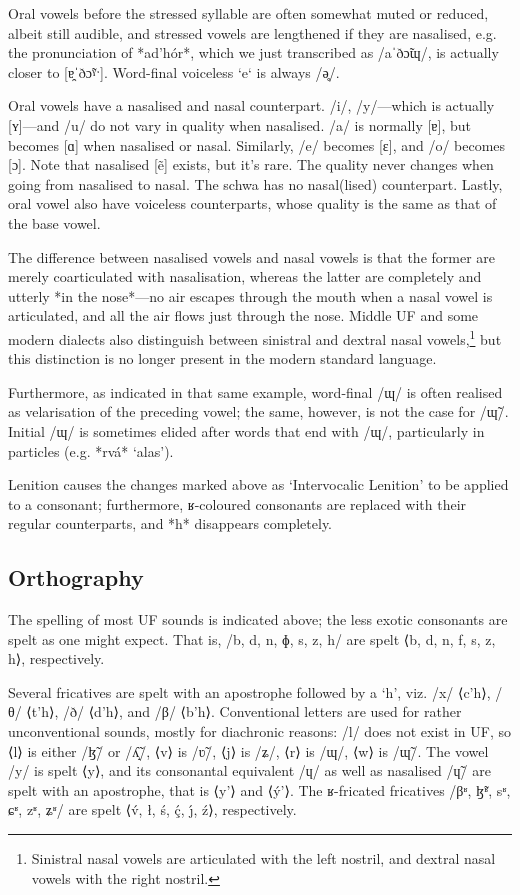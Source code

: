 \documentclass[a4paper, 12pt, oneside, final]{article}
\begin{document}
Oral vowels before the stressed syllable are often somewhat muted or reduced, albeit still audible, and stressed vowels are lengthened if they
are nasalised, e.g. the pronunciation of *ad’hór*, which we just transcribed as /aˈðɔ̃ɰ/, is actually closer to [ɐ̯ˈðɔ̃ˠˑ].
Word-final voiceless `e` is always /ə̥/.

Oral vowels have a nasalised and nasal counterpart. /i/, /y/—which is actually [ʏ]—and /u/ do not vary in quality when nasalised.
/a/ is normally [ɐ],
but becomes [ɑ] when nasalised or nasal. Similarly, /e/ becomes [ɛ], and /o/ becomes [ɔ]. Note that nasalised [ẽ] exists, but it’s
rare. The quality never changes when going from nasalised to nasal. The schwa has no nasal(lised) counterpart. Lastly, oral vowel
also have voiceless counterparts, whose quality is the same as that of the base vowel.

The difference between nasalised vowels and nasal vowels is that the former are merely coarticulated with nasalisation, whereas
the latter are completely and utterly *in the nose*—no air escapes through the mouth when a nasal vowel is articulated, and all
the air flows just through the nose. Middle UF and some modern dialects also distinguish between sinistral and dextral nasal
vowels,\footnote{Sinistral nasal vowels are articulated with the left nostril, and dextral nasal vowels with the right nostril.}
but this distinction is no longer present in the modern standard language.

Furthermore, as indicated in that same example, word-final /ɰ/ is often realised as velarisation of the preceding vowel;
the same, however, is not the case for /ɰ̃/. Initial /ɰ/ is sometimes elided after words that end with /ɰ/, particularly
in particles (e.g. *rvá* ‘alas’).

Lenition causes the changes marked above as ‘Intervocalic Lenition’ to be applied to a consonant; furthermore,
ʁ-coloured consonants are replaced with their regular counterparts, and *h* disappears completely.

\subsection{Orthography}
The spelling of most UF sounds is indicated above; the less exotic consonants are spelt as
one might expect. That is, /b, d, n, ɸ, s, z, h/ are spelt ⟨b, d, n, f, s, z, h⟩, respectively.

Several fricatives are spelt with an apostrophe followed by a ‘h’, viz. /x/ ⟨c’h⟩, /θ/ ⟨t’h⟩, /ð/ ⟨d’h⟩,
and /β/ ⟨b’h⟩. Conventional letters are used for rather unconventional sounds, mostly for diachronic reasons:
/l/ does not exist in UF, so ⟨l⟩ is either /ɮ̃/ or /ʎ̝̃/, ⟨v⟩ is /ʋ̃/, ⟨j⟩ is /ʑ/, ⟨r⟩ is /ɰ/, ⟨w⟩ is /ɰ̃/. The vowel
/y/ is spelt ⟨y⟩, and its consonantal equivalent /ɥ/ as well as nasalised /ɥ̃/ are spelt with an apostrophe, that is
⟨y’⟩ and ⟨ý’⟩. The ʁ-fricated fricatives /βʶ, ɮ̃ʶ, sʶ, ɕʶ, zʶ, ʑʶ/
are spelt ⟨v́, ł, ś, ḉ, ȷ́, ź⟩, respectively.
\end{document}
